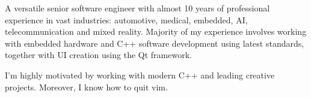 

\begin{cvparagraph}

A versatile senior software engineer with almost 10 years of professional experience in vast industries: automotive, medical, embedded, AI, telecommunication and mixed reality. Majority of my experience involves working with embedded hardware and C++ software development using latest standards, together with UI creation using the Qt framework.

I'm highly motivated by working with modern C++ and leading creative projects. Moreover, I know how to quit vim.

\end{cvparagraph}
